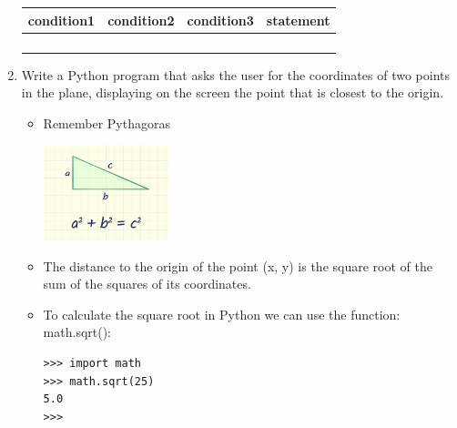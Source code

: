 \begin{enumerate}
\begin{tabular}{|l|l|l|l|}
\hline
condition1 & condition2 & condition3 & statement \\
\hline
\hline
           &            &            &             \\ \hline
           &            &            &        
          \\ \hline
                     &            &            &        
          \\ \hline
                     &            &            &        
          \\ \hline
\end{tabular}


\item \label{coords} Write a Python program that asks the user for the coordinates of two points in the plane, displaying on the screen the point that is closest to the origin.

\begin{itemize}
    \item Remember Pythagoras
    
    \includegraphics[width=0.3\textwidth]{images/pythagoras.png}
    \item The distance to the origin of the point (x, y) is the square root of the sum of the squares of its coordinates.
    \item To calculate the square root in Python we can use the function: math.sqrt():

\begin{Verbatim}[frame=single]
>>> import math
>>> math.sqrt(25)
5.0
>>> 
\end{Verbatim}
\end{itemize}


\end{enumerate}
